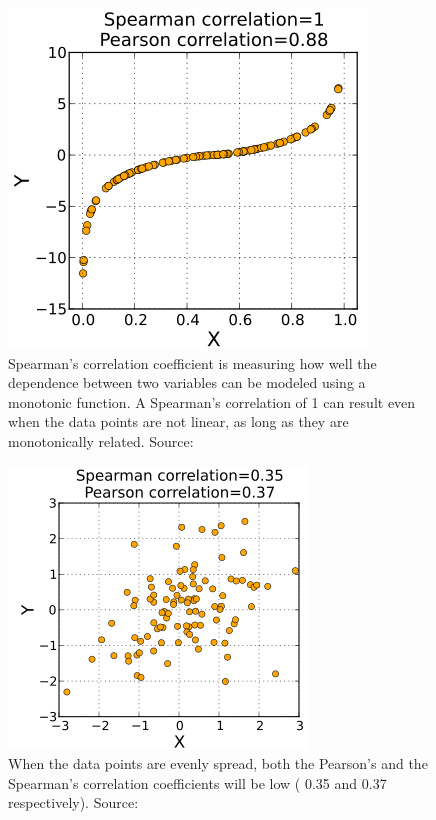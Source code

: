 \begin{figure}[h]
  \centering
\includegraphics[scale=0.6]{images/spearman1.png}
\caption{Spearman's correlation coefficient is measuring how well the
dependence between two variables can be modeled
using a monotonic function. A Spearman's correlation of 1 can result even
when the data points are not linear, as long as they are monotonically related.
Source:\cite{spearman2009Wiki}}
\label{fig:spearman1}
\end{figure}


\begin{figure}[h]
  \centering
\includegraphics[scale=0.7]{images/spearman2.png}
\caption{When the data points are evenly spread,
both the Pearson's and the Spearman's
correlation coefficients will be low ( 0.35 and
0.37 respectively). Source:\cite{spearman2009Wiki}}
\label{fig:spearman2}
\end{figure}

